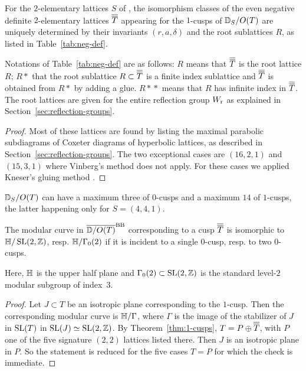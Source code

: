 \documentclass{amsart}
\begin{document}
\begin{theorem}\label{thm:2-elem-negdef}
  For the $2$-elementary lattices $S$ of \fign, the isomorphism
  classes of the even negative definite $2$-elementary lattices ${\overline{\overline T}}$
  appearing for the $1$-cusps of ${\mathbb D}_S/O(T)$ are uniquely determined
  by their invariants $(r,a,\delta)$ and the root sublattices $R$, 
  as listed in Table~\ref{tab:neg-def}. 
\end{theorem}
Notations of Table~\ref{tab:neg-def} are as follows: $R$ means
that ${\overline{\overline T}}$ is the root lattice $R$; $R*$ that the root sublattice
$R\subset {\overline{\overline T}}$ is a finite index sublattice and ${\overline{\overline T}}$ is
obtained from $R*$ by adding a glue.  $R\!*\!*$ means that $R$ has infinite
index in ${\overline{\overline T}}$. The root lattices are given for the entire reflection
group $W_{\rm r}$ as explained in Section~\ref{sec:reflection-groups}.

\begin{proof}
  Most of these lattices are found by listing the maximal
  parabolic subdiagrams of Coxeter diagrams of hyperbolic lattices, as
  described in Section~\ref{sec:reflection-groups}. The two
  exceptional cases are $(16,2,1)$ and $(15,3,1)$ where Vinberg's
  method does not apply. For these cases we applied Kneser's gluing
  method \cite[15.10.2]{conway1999sphere-packings}.  
\end{proof}



\begin{corollary}
  ${\mathbb D}_S/O(T)$ can have a maximum three of $0$-cusps and a
  maximum $14$ of $1$-cusps, the latter happening only for $S=(4,4,1)$.
\end{corollary}

\begin{proposition}\label{prop:1-cusps-modular}
  The modular curve in $\overline{{\mathbb D}/O(T)}^{\rm BB}$ corresponding to a cusp ${\overline{\overline T}}$ is
  isomorphic to ${\mathbb H}/\operatorname{SL}(2,{\mathbb Z})$, resp. ${\mathbb H}/\Gamma_0(2)$
  if it is incident to a single $0$-cusp, resp. to two $0$-cusps.
\end{proposition}
Here, ${\mathbb H}$ is the upper half plane and $\Gamma_0(2)\subset
\operatorname{SL}(2,{\mathbb Z})$ is the standard level-$2$ modular subgroup of index~$3$.

\begin{proof}
  Let $J\subset T$ be an isotropic plane corresponding to the
  $1$-cusp. Then the corresponding modular curve is ${\mathbb H}/\Gamma$,
  where $\Gamma$ is the image of the stabilizer of $J$ in $\operatorname{SL}(T)$ in
  $\operatorname{SL}(J)\simeq\operatorname{SL}(2,{\mathbb Z})$. By Theorem~\ref{thm:1-cusps},
  $T=P\oplus{\overline{\overline T}}$, with $P$ one of the five signature $(2,2)$ lattices
  listed there. Then $J$ is an isotropic plane in $P$. So the
  statement is reduced for the five cases $T=P$ for which the check is
  immediate. 
\end{proof}
\end{document}

